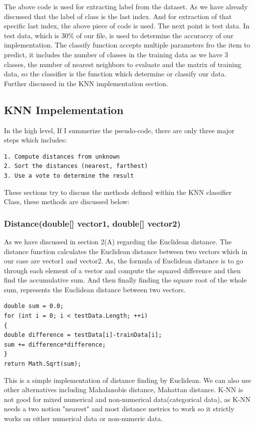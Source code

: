 \documentclass[conference]{IEEEtran}
\begin{document}
The above code is used for extracting label from the dataset. As we have already discussed that the label of class is the last index. And for extraction of that specific last index, the above piece of code is used. The next point is test data. In test data, which is 30\% of our file, is used to determine the accuraccy of our implementation. The classify function accepts multiple parameters fro the item to predict, it includes the number of classes in the training data as we have 3 classes, the number of nearest neighbors to evaluate and the matrix of training data, so the classifier is the function which determine or classify our data. Further discussed in the KNN implementation section. 





\subsection{KNN Impelementation}
In the high level, If I summerize the pseudo-code, there are only three major steps which includes:
\begin{lstlisting}
1. Compute distances from unknown
2. Sort the distances (nearest, farthest)
3. Use a vote to determine the result
\end{lstlisting}

These sections try to discuss the methods defined within the KNN classifier Class, these methods are discussed below:

\subsubsection{Distance(double[] vector1, double[] vector2)}
As we have discussed in section 2(A) regarding the Euclidean distance. The distance function calculates the Euclidean distance between two vectors which in our case are vector1 and vector2. As, the formula of Euclidean distance is to go through each element of a vector and compute the squared difference and then find the accumulative sum. And then finally finding the square root of the whole sum, represents the Euclidean distance between two vectors. 

\begin{lstlisting}
double sum = 0.0;
for (int i = 0; i < testData.Length; ++i)
{
double difference = testData[i]-trainData[i];
sum += difference*difference;
}
return Math.Sqrt(sum);
\end{lstlisting}

This is a simple implementation of distance finding by Euclidean. We can also use other alternatives including Mahalanobis distance, Mahattan distance. K-NN is not good for mixed numerical and non-numerical data(categorical data), as K-NN needs a two notion "nearest" and most distance metrics to work so it strictly works on either numerical data or non-numeric data.  
\end{document}
